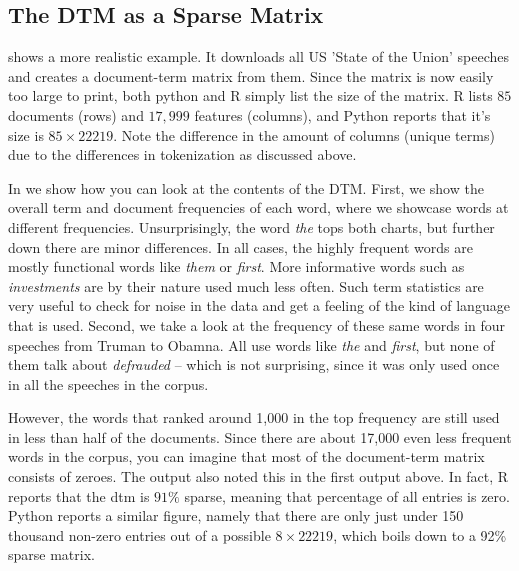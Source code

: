 \subsection{The DTM as a Sparse Matrix}


 shows a more realistic example.
It downloads all US 'State of the Union' speeches and creates a document-term matrix from them.
Since the matrix is now easily too large to print, both python and R simply list the size of the matrix.
R lists $85$ documents (rows) and $17,999$ features (columns), and Python reports that it's size is $85\times22219$.
Note the difference in the amount of columns (unique terms) due to the differences in tokenization as discussed above. 


In  we show how you can look at the contents of the DTM. First, we show the overall term and document frequencies of each word, where we showcase words at different frequencies. Unsurprisingly, the word \emph{the} tops both charts, but further down there are minor differences.
In all cases, the highly frequent words are mostly functional words like \emph{them} or \emph{first}. More informative words such as \emph{investments} are by their nature used much less often.
Such term statistics are very useful to check for noise in the data and get a feeling of the kind of language that is used. 
Second, we take a look at the frequency of these same words in four speeches from Truman to Obamna. All use words like \emph{the} and \emph{first}, but none of them talk about \emph{defrauded} -- which is not surprising, since it was only used once in all the speeches in the corpus.

However, the words that ranked around 1,000 in the top frequency are still used in less than half of the documents.
Since there are about 17,000 even less frequent words in the corpus, you can imagine that most of the document-term matrix consists of zeroes. 
The output also noted this  in the first output above.
In fact, R reports that the dtm is $91\%$ sparse, meaning that percentage of all entries is zero.
Python reports a similar figure, namely that there are only just under 150 thousand non-zero entries
out of a possible $8\times22219$, which boils down to a 92\% sparse matrix.

